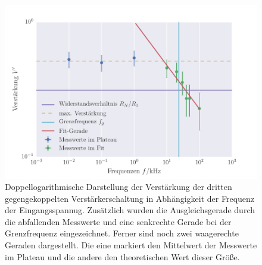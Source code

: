 \FloatBarrier
\begin{figure}[!h]
\centering
\includegraphics[scale=1]{../Grafiken/Gegengekoppelter_Verstaerker_3.pdf}
\caption{Doppellogarithmische Darstellung der Verstärkung der dritten gegengekoppelten Verstärkerschaltung in Abhängigkeit der Frequenz der Eingangsspannug. Zusätzlich wurden die Ausgleichsgerade
	durch die abfallenden Messwerte und eine senkrechte Gerade bei der Grenzfrequenz eingezeichnet. Ferner sind noch  zwei waagerechte Geraden dargestellt. Die eine markiert den Mittelwert der Messwerte im Plateau und die  andere
	den theoretischen Wert dieser Größe.\label{fig:gegengekoppelter_verstaerker_3}}
\end{figure}
\FloatBarrier